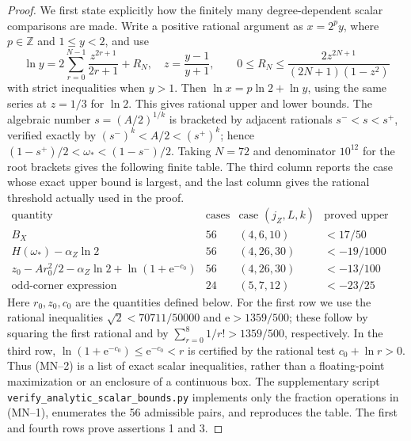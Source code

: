 \documentclass[10pt,a4paper]{amsart}
\begin{document}
\begin{proof}
We first state explicitly how the finitely many degree-dependent scalar
comparisons are made.  Write a positive rational argument as
\(x=2^py\), where \(p\in\mathbb Z\) and \(1\le y<2\), and use
\[
 \ln y=2\sum_{r=0}^{N-1}\frac{z^{2r+1}}{2r+1}+R_N,
 \quad z=\frac{y-1}{y+1},\qquad
 0\le R_N\le\frac{2z^{2N+1}}{(2N+1)(1-z^2)}            \tag{MN--1}
\]
with strict inequalities when \(y>1\).  Then
\(\ln x=p\ln2+\ln y\), using the same series at \(z=1/3\) for
\(\ln2\).  This gives rational upper and lower bounds.  The algebraic number
\(s=(A/2)^{1/k}\) is bracketed by adjacent rationals \(s^-<s<s^+\),
verified exactly by \((s^-)^k<A/2<(s^+)^k\); hence
\((1-s^+)/2<\omega_*<(1-s^-)/2\).  Taking \(N=72\) and denominator
\(10^{12}\) for the root brackets gives the following finite table.
The third column reports the case whose exact upper bound is largest, and
the last column gives the rational threshold actually used in the proof.
\[
\begin{array}{l|c|c|c}
\text{quantity}&\text{cases}&\text{case }(j_Z,L,k)&
 \text{proved upper bound}\\ \hline
B_X&56&(4,6,10)& <17/50\\
H(\omega_*)-\alpha_Z\ln2&56&(4,26,30)&<-19/1000\\
z_0-Ar_0^2/2-\alpha_Z\ln2+\ln(1+\mathrm e^{-c_0})
 &56&(4,26,30)&<-13/100\\
\text{odd-corner expression}&24&(5,7,12)&<-23/25
\end{array}                                                     \tag{MN--2}
\]
Here \(r_0,z_0,c_0\) are the quantities defined below.  For the first
row we use the rational inequalities
\(\sqrt2<70711/50000\) and \(\mathrm e>1359/500\); these follow by
squaring the first rational and by
\(\sum_{r=0}^8 1/r!>1359/500\), respectively.  In the third row,
\(\ln(1+\mathrm e^{-c_0})\le\mathrm e^{-c_0}<r\) is certified by the
rational test \(c_0+\ln r>0\).  Thus (MN--2) is a list of exact scalar
inequalities, rather than a floating-point maximization or an enclosure
of a continuous box.  The supplementary script
\texttt{verify\_analytic\_scalar\_bounds.py} implements only the fraction
operations in (MN--1), enumerates the 56 admissible pairs, and reproduces
the table.  The first and fourth rows prove assertions 1 and 3.


\end{proof}
\end{document}
